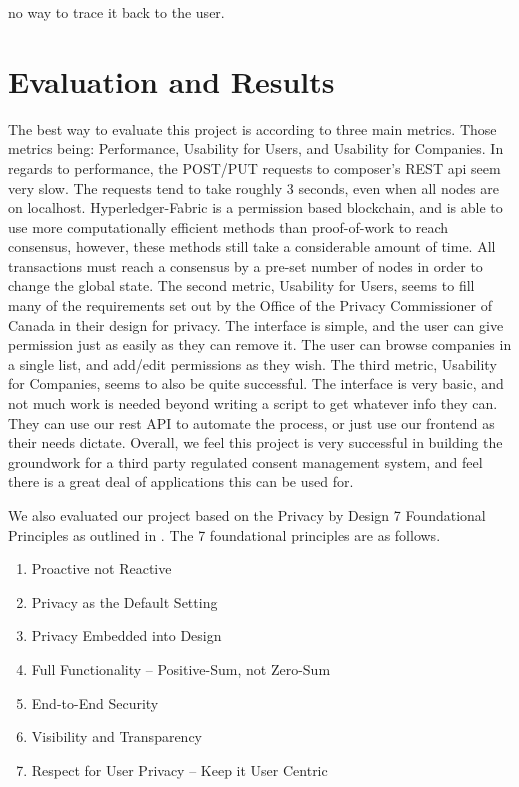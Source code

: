 \documentclass[11pt,journal]{IEEEtran}
\begin{document}
no way to trace it back to the user.


\section{Evaluation and Results} \label{sec:eval}

The best way to evaluate this project is according to three main metrics.  Those metrics being: Performance, Usability for Users, and Usability for Companies.  In regards to performance, the POST/PUT requests to composer’s REST api seem very slow.  The requests tend to take roughly 3 seconds, even when all nodes are on localhost.  Hyperledger-Fabric is a permission based blockchain, and is able to use more computationally efficient methods than proof-of-work to reach consensus, however, these methods still take a considerable amount of time.  All transactions must reach a consensus by a pre-set number of nodes in order to change the global state.  The second metric, Usability for Users, seems to fill many of the requirements set out by the Office of the Privacy Commissioner of Canada \cite{Canadian67:online} in their design for privacy.  The interface is simple, and the user can give permission just as easily as they can remove it.  The user can browse companies in a single list, and add/edit permissions as they wish.  The third metric, Usability for Companies, seems to also be quite successful.  The interface is very basic, and not much work is needed beyond writing a script to get whatever info they can.  They can use our rest API to automate the process, or just use our frontend as their needs dictate.  Overall, we feel this project is very successful in building the groundwork for a third party regulated consent management system, and feel there is a great deal of applications this can be used for.

We also evaluated our project based on the Privacy by Design 7 Foundational Principles as outlined in \cite{cavoukian2010privacy}. The 7 foundational principles are as follows.

\begin{enumerate}
  \item Proactive not Reactive
  \item Privacy as the Default Setting
  \item Privacy Embedded into Design
  \item Full Functionality -- Positive-Sum, not Zero-Sum
  \item End-to-End Security
  \item Visibility and Transparency
  \item Respect for User Privacy -- Keep it User Centric
\end{enumerate}
\end{document}
